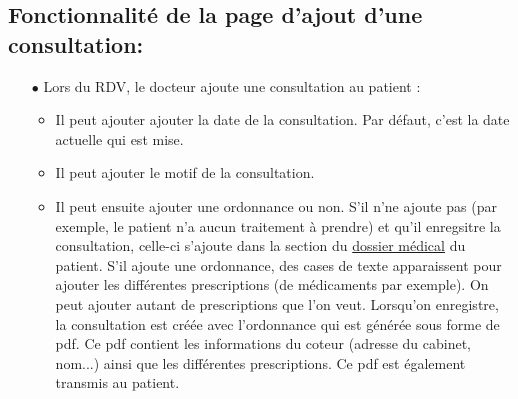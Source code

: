\documentclass[a4paper]{report}
\begin{document}
\subsection{{Fonctionnalité de la page d'ajout d'une consultation}:}\label{consultation}
\begin{itemize}
    \item[$\bullet$] Lors du RDV, le docteur ajoute une consultation au patient :
    \begin{itemize}
        \item Il peut ajouter ajouter la date de la consultation. Par défaut, c'est la date actuelle qui est mise.
        \item Il peut ajouter le motif de la consultation.
        \item Il peut ensuite ajouter une ordonnance ou non. S'il n'ne ajoute pas (par exemple, le patient n'a aucun traitement à prendre) et qu'il enregsitre la consultation,
        celle-ci s'ajoute dans la section du {\hyperref[dossier médical]{dossier médical}} du patient. S'il ajoute une ordonnance, des cases de texte apparaissent pour ajouter les différentes
        prescriptions (de médicaments par exemple). On peut ajouter autant de prescriptions que l'on veut. Lorsqu'on enregistre, la consultation est créée avec l'ordonnance qui est générée sous forme de pdf.
        Ce pdf contient les informations du coteur (adresse du cabinet, nom...) ainsi que les différentes prescriptions. Ce pdf est également transmis au patient.
    \end{itemize}
\end{itemize}
\vspace{3mm}
    
\end{document}
